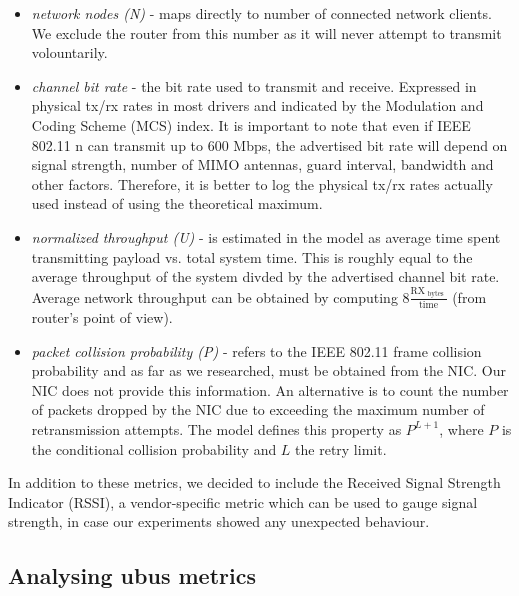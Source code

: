 \begin{itemize}

    \item \emph{network nodes (N)} - maps directly to number of connected network clients. We exclude
    the router from this number as it will never attempt to transmit volountarily.

    \item \emph{channel bit rate} - the bit rate used to transmit and receive.
    Expressed in physical tx/rx rates in most drivers and indicated by the
    Modulation and Coding Scheme (MCS) index. It is important to note that even if
    IEEE 802.11 n can transmit up to 600 Mbps, the advertised bit rate will depend
    on signal strength, number of MIMO antennas, guard interval, bandwidth and
    other factors. Therefore, it is better to log the physical tx/rx rates
    actually used instead of using the theoretical maximum.

    \item \emph{normalized throughput (U)} - is estimated in the model as average time
    spent transmitting payload vs. total system time. This is roughly equal to the average
    throughput of the system divded by the advertised channel bit rate. Average network throughput
    can be obtained by computing $ 8 \frac{ \text{RX}_\text{ bytes } }{ \text{time} } $ (from router's point of view).

    \item \emph{packet collision probability (P)} - refers to the IEEE 802.11
    frame collision probability and as far as we researched, must be obtained from
    the NIC. Our NIC does not provide this information. An alternative is to count
    the number of  packets dropped by the NIC due to
    exceeding the maximum number of retransmission attempts. The model defines
    this property as $P^{L+1}$, where $P$ is the conditional collision probability
    and $L$ the retry limit.

\end{itemize}

In addition to these metrics, we decided to include the Received Signal
Strength Indicator (RSSI), a vendor-specific metric which can be used to gauge
signal strength, in case our experiments showed any unexpected behaviour.

\subsection{Analysing ubus metrics}

